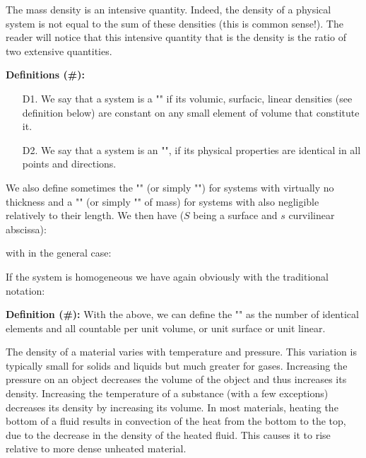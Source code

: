 	\begin{tcolorbox}[title=Remark,colframe=black,arc=10pt]
	The mass density is an intensive quantity. Indeed, the density of a physical system is not equal to the sum of these densities (this is common sense!). The reader will notice that this intensive quantity that is the density is the ratio of two extensive quantities.
	\end{tcolorbox}
	\textbf{Definitions (\#\mydef):}
	\begin{enumerate}
		\item[D1.] We say that a system is a "" if its volumic, surfacic, linear densities (see definition below) are constant on any small element of volume that constitute it.

		\item[D2.] We say that a system is an "", if its physical properties are identical in all points and directions.
	\end{enumerate}
	We also define sometimes the "" (or simply "") for systems with virtually no thickness and a "" (or  simply "" of mass) for systems with also negligible relatively to their length. We then have ($S$ being a surface and $s$ curvilinear abscissa):
	
	with in the general case:
	
	If the system is homogeneous we have again obviously with the traditional notation:
	
	\textbf{Definition (\#\mydef):} With the above, we can define the "" as the number of identical elements and all countable per unit volume, or unit surface or unit linear.
	
	The density of a material varies with temperature and pressure. This variation is typically small for solids and liquids but much greater for gases. Increasing the pressure on an object decreases the volume of the object and thus increases its density. Increasing the temperature of a substance (with a few exceptions) decreases its density by increasing its volume. In most materials, heating the bottom of a fluid results in convection of the heat from the bottom to the top, due to the decrease in the density of the heated fluid. This causes it to rise relative to more dense unheated material.
	
